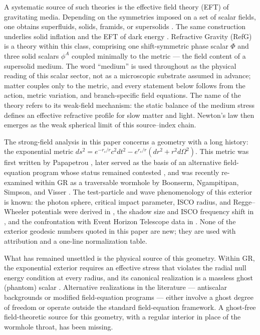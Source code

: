 \documentclass[12pt,a4paper]{article}
\begin{document}
A systematic source of such theories is the effective field theory (EFT) of
gravitating media. Depending on the symmetries imposed on a set of scalar
fields, one obtains superfluids, solids, framids, or supersolids
\cite{NicolisEtAl2015,CeloriaComelliPilo2017}. The same construction underlies
solid inflation \cite{Endlich2013} and the EFT of dark energy
\cite{Cheung2008,Gubitosi2013,BelliniSawicki2014}. Refractive Gravity (RefG)
is a theory within this class, comprising one shift-symmetric phase scalar
$\Phi$ and three solid scalars $\phi^A$ coupled minimally to the metric --- the
field content
of a supersolid medium. The word ``medium'' is used throughout as the physical
reading of this scalar sector, not as a microscopic substrate assumed in
advance; matter couples only to the metric, and every statement below follows
from the action, metric variation, and branch-specific field equations. The
name of the theory refers to its weak-field mechanism: the static balance of
the medium stress defines an effective refractive profile for slow matter and
light. Newton's law then emerges as the weak spherical limit of this
source--index chain.

The strong-field analysis in this paper concerns a geometry with a long
history: the exponential metric
$ds^2=e^{-r_s/r}c^2dt^2-e^{r_s/r}(dr^2+r^2d\Omega^2)$. This metric was first
written by Papapetrou \cite{Papapetrou1954}, later served as the basis of an
alternative field-equation program whose status remained contested
\cite{Yilmaz1958,Misner1999,AlleyYilmaz1995}, and was recently re-examined within
GR as a traversable wormhole by Boonserm, Ngampitipan, Simpson, and Visser
\cite{Boonserm2018}. The test-particle and wave phenomenology of this exterior
is known: the photon sphere, critical impact parameter, ISCO radius, and
Regge--Wheeler potentials were derived in \cite{Boonserm2018}, the shadow size
and ISCO frequency shift in \cite{MakukovMychelkin2018}, and the confrontation
with Event Horizon Telescope data in \cite{Vagnozzi2023}. None of the
exterior geodesic numbers quoted in this paper are new; they are used with
attribution and a one-line normalization table.

What has remained unsettled is the physical source of this geometry. Within
GR, the exponential exterior requires an effective stress that violates the
radial null energy condition at every radius, and its canonical realization is
a massless ghost (phantom) scalar \cite{Boonserm2018}. Alternative realizations
in the literature --- antiscalar backgrounds \cite{MakukovMychelkin2018} or
modified field-equation programs \cite{Yilmaz1958} --- either involve a ghost
degree of freedom or operate outside the standard field-equation framework. A
ghost-free field-theoretic source for this geometry, with a regular interior in
place of the wormhole throat, has been missing.
\end{document}
